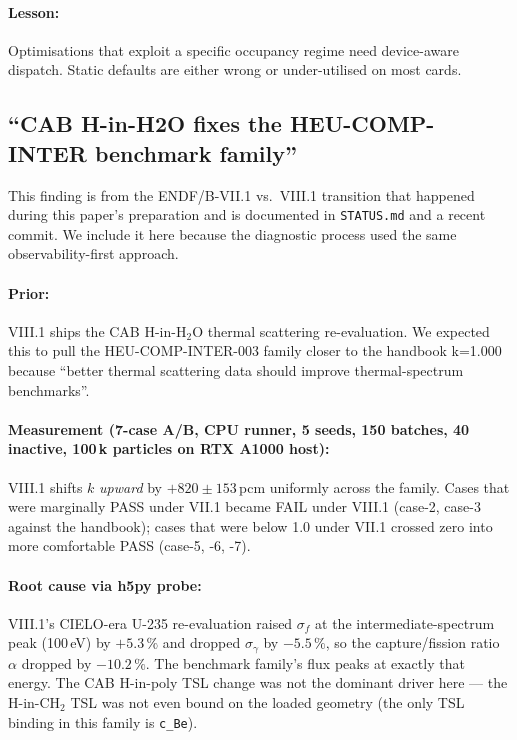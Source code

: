 \paragraph{Lesson:} Optimisations that exploit a specific
occupancy regime need device-aware dispatch. Static defaults are
either wrong or under-utilised on most cards.

\subsection{``CAB H-in-H2O fixes the HEU-COMP-INTER benchmark family''}

This finding is from the ENDF/B-VII.1 vs.\ VIII.1 transition that
happened during this paper's preparation and is documented in
\texttt{STATUS.md} and a recent commit. We include it here because
the diagnostic process used the same observability-first approach.

\paragraph{Prior:} VIII.1 ships the CAB H-in-H$_2$O thermal
scattering re-evaluation. We expected this to pull the
HEU-COMP-INTER-003 family closer to the handbook k=1.000 because
``better thermal scattering data should improve thermal-spectrum
benchmarks''.

\paragraph{Measurement (7-case A/B, CPU runner, 5 seeds, 150
batches, 40 inactive, 100\,k particles on RTX A1000 host):} VIII.1
shifts $k$ \emph{upward} by $+820 \pm 153\,$pcm uniformly across
the family. Cases that were marginally PASS under VII.1 became
FAIL under VIII.1 (case-2, case-3 against the handbook); cases
that were below 1.0 under VII.1 crossed zero into more
comfortable PASS (case-5, -6, -7).

\paragraph{Root cause via h5py probe:} VIII.1's CIELO-era U-235
re-evaluation raised $\sigma_f$ at the intermediate-spectrum
peak (100\,eV) by $+5.3\,\%$ and dropped $\sigma_\gamma$ by
$-5.5\,\%$, so the capture/fission ratio $\alpha$ dropped by
$-10.2\,\%$. The benchmark family's flux peaks at exactly that
energy. The CAB H-in-poly TSL change was not the dominant driver
here --- the H-in-CH$_2$ TSL was not even bound on the loaded
geometry (the only TSL binding in this family is
\texttt{c\_Be}).

